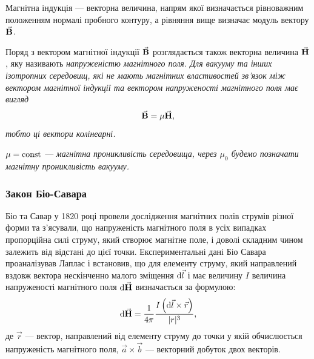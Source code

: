Магнітна індукція --- векторна величина, напрям якої визначається рівноважним положенням нормалі пробного контуру, а рівняння вище визначає модуль вектору ${\vec{\mathbf{B}}}$.

\begin{definition}
	Поряд з вектором магнітної індукції ${\vec{\mathbf{B}}}$ розглядається також векторна величина ${\vec{\mathbf{H}}}$, яку називають \it{напруженістю магнітного поля}. Для вакууму та інших ізотропних середовищ, які не мають магнітних властивостей зв'язок між вектором магнітної індукції та вектором напруженості магнітного поля має вигляд
	\begin{equation}
		{\vec{\mathbf{B}}} = \mu {\vec{\mathbf{H}}},
	\end{equation}
	тобто ці вектори колінеарні.
\end{definition}

\begin{definition}
	$\mu = \operatorname{const}$ --- \it{магнітна проникливість середовища}, через $\mu_0$ будемо позначати магнітну проникливість вакууму.
\end{definition}

\subsubsection{Закон Біо-Савара}

Біо та Савар у 1820 році провели дослідження магнітних полів струмів різної форми та з'ясували, що напруженість магнітного поля в усіх випадках пропорційна силі струму, який створює магнітне поле, і доволі складним чином залежить від відстані до цієї точки. Експериментальні дані Біо Савара проаналізував Лаплас і встановив, що для елементу струму, який направлений вздовж вектора нескінченно малого зміщення $\mathop{}\!\mathrm{d} \vec l$ і має величину $I$ величина напруженості магнітного поля $\mathop{}\!\mathrm{d} {\vec{\mathbf{H}}}$ визначається за формулою:
\begin{equation}
	\mathop{}\!\mathrm{d} {\vec{\mathbf{H}}} = \frac{1}{4 \pi} \frac{I \left(\mathop{}\!\mathrm{d} \vec l \times \vec r\right)}{|r|^3},
\end{equation}
де $\vec r$ --- вектор, направлений від елементу струму до точки у якій обчислюється напруженість магнітного поля, $\vec a \times \vec b$ --- векторний добуток двох векторів.  \medskip


